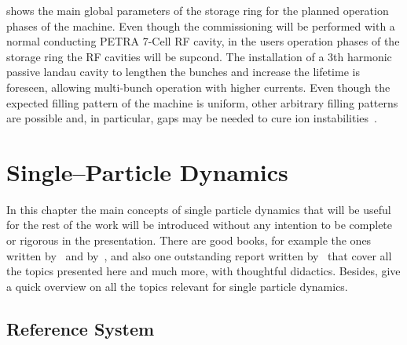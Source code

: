     shows the main global parameters of the storage ring for the planned operation phases of the machine. Even though the commissioning will be performed with a normal conducting PETRA 7-Cell RF cavity, in the users operation phases of the storage ring the RF cavities will be \gls{supcond}. The installation of a 3th harmonic passive landau cavity to lengthen the bunches and increase the lifetime is foreseen, allowing multi-bunch operation with higher currents. Even though the expected filling pattern of the machine is uniform, other arbitrary filling patterns are possible and, in particular, gaps may be needed to cure ion instabilities~\cite{Wang2013a,Nagaoka2014}.


\chapter{Single--Particle Dynamics}\label{cap:single_particle_dynamics}

    In this chapter the main concepts of single particle dynamics that will be useful for the rest of the work will be introduced without any intention to be complete or rigorous in the presentation. There are good books, for example the ones written by~ and by~, and also one outstanding report written by~ that cover all the topics presented here and much more, with thoughtful didactics. Besides,  give a quick overview on all the topics relevant for single particle dynamics.

\section{Reference System}

